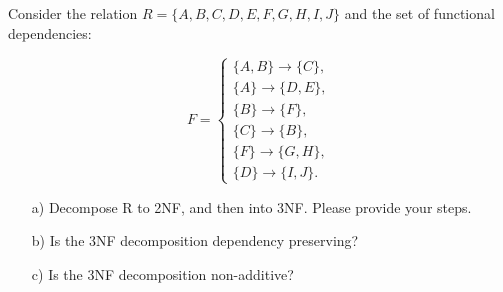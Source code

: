 \documentclass[working, oneside]{../../Preambles/tuftebook}
\begin{document}
\begin{exercise}[4]
Consider the relation \( R = \{A, B, C, D, E, F, G, H, I, J\} \) and the set of functional dependencies:

\[
F = 
\begin{cases}
\{A, B\} \to \{C\}, \\
\{A\} \to \{D, E\}, \\
\{B\} \to \{F\}, \\
\{C\} \to \{B\}, \\
\{F\} \to \{G, H\}, \\
\{D\} \to \{I, J\}.
\end{cases}
\]
\begin{itemize}
    \item[a)] Decompose R to 2NF, and then into 3NF. Please provide your steps.
    \item[b)] Is the 3NF decomposition dependency preserving?
    \item[c)] Is the 3NF decomposition non-additive?
\end{itemize}
\end{exercise}
\end{document}
